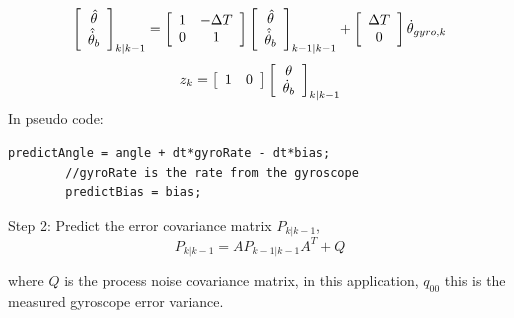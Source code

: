\documentclass[a4paper]{report}
\begin{document}
		\begin{equation}
		\left[
      		\begin{array}{c}
      		\hat{\theta}\\
		\hat{\dot{\theta}}_{b}
      		\end{array} \right]_{k|k-1}
		=
		\left[
		\begin{array}{c c}
		1 & - \Delta T\\
		0 & 1
		\end{array} \right]
		\left[
		\begin{array}{c}
		\hat{\theta}\\
		\hat{\dot{\theta}}_{b}
		\end{array} \right]_{k-1|k-1}
		+
		\left[
		\begin{array}{c}
		\Delta T\\
		0
		\end{array} \right]
		\dot{\theta}_{gyro, k}\\
		\end{equation}
		\begin{equation}
		z_{k}=
		\left[
		\begin{array}{c c}
		1 & 0
		\end{array} \right]
		\left[
		\begin{array}{c}
		\theta\\
		\dot{\theta}_{b}
		\end{array} \right]_{k|k-1}
		\end{equation}
    In pseudo code:
    \begin{lstlisting}[frame=single]
		predictAngle = angle + dt*gyroRate - dt*bias;
		//gyroRate is the rate from the gyroscope
		predictBias = bias;
		\end{lstlisting}

		Step 2: Predict the error covariance matrix $P_{k|k-1}$,
		\begin{equation}
		P_{k|k-1}=AP_{k-1|k-1}A^{T}+Q
		\end{equation}

		where $Q$ is the process noise covariance matrix, in this application, $q_{00}$ this is the measured gyroscope error variance.
\end{document}
